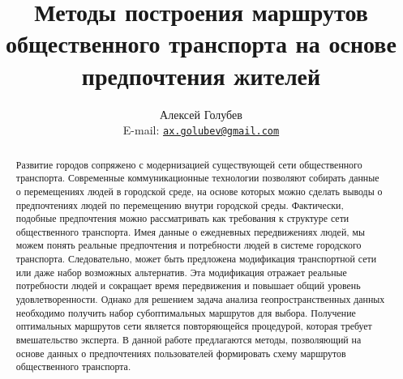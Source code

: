 \documentclass[a4paper, 12pt]{article}
\begin{document}
    \sloppy
    \title{Методы построения маршрутов общественного транспорта на основе предпочтения жителей}
    \author{Алексей Голубев\\[6pt]\normalsize E-mail:
    \href{mailto:ax.golubev@gmail.com}{\texttt{ax.golubev@gmail.com}}}
    \maketitle
    \begin{abstract}\noindent
        Развитие городов сопряжено с модернизацией существующей сети общественного транспорта. Современные 
        коммуникационные технологии позволяют собирать данные о перемещениях людей в городской среде, на 
        основе которых можно сделать выводы о предпочтениях людей по перемещению внутри городской среды. 
        Фактически, подобные предпочтения можно рассматривать как требования к структуре сети общественного 
        транспорта. Имея данные о ежедневных передвижениях людей, мы можем понять реальные предпочтения и 
        потребности людей в системе городского транспорта. Следовательно, может быть предложена модификация 
        транспортной сети или даже набор возможных альтернатив. Эта модификация отражает реальные потребности 
        людей и сокращает время передвижения и повышает общий уровень удовлетворенности. Однако для решением 
        задача анализа геопространственных данных необходимо получить набор субоптимальных маршрутов для 
        выбора. Получение оптимальных маршрутов сети является повторяющейся процедурой, которая требует 
        вмешательство эксперта. В данной работе предлагаются методы, позволяющий на основе данных о 
        предпочтениях пользователей формировать схему маршрутов общественного транспорта.
    \end{abstract}
    \newpage
    
\end{document}
